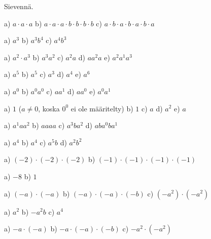 {%
Sievennä.
\begin{tehtava}
a) $a\cdot a\cdot a$ \quad b) $a\cdot a\cdot a\cdot b\cdot b\cdot b\cdot b$ \quad
c) $a\cdot b\cdot a\cdot b\cdot a\cdot b\cdot a$
\begin{vastaus}
a) $a^3$ \qquad b) $a^3b^4$ \qquad c) $a^4b^3$
\end{vastaus}
\end{tehtava}
\begin{tehtava}
a) $a^2\cdot a^3$ \qquad b) $a^3a^2$ \qquad c) $a^2 a$ \qquad d) $a a^2 a$ \qquad
e) $a^2a^1a^3$
\begin{vastaus}
a) $a^5$ \qquad b) $a^5$ \qquad c) $a^3$ \qquad d) $a^4$ \qquad e) $a^6$
\end{vastaus}
\end{tehtava}
\begin{tehtava}
a) $a^0$ \qquad b) $a^0a^0$ \qquad c) $a a^1$ \qquad d) $aa^0$ \qquad
e) $a^0a^1$
\begin{vastaus}
a) $1$ \quad ($a\neq0$, koska $0^0$ ei ole määritelty) \qquad b) $1$ \qquad c) $a$ \qquad d) $a^2$ \qquad
e) $a$
\end{vastaus}
\end{tehtava}
\begin{tehtava}
a) $a^1 a a^2$ \qquad b) $aaaa$ \qquad c) $a^3ba^2$ \qquad d) $aba^0ba^1$
\begin{vastaus}
a) $ a^4$ \qquad b) $a^4$ \qquad c) $a^5b$ \qquad d) $a^2b^2$
\end{vastaus}
\end{tehtava}
\begin{tehtava}
a) $(-2)\cdot(-2)\cdot(-2)$ \qquad b) $(-1)\cdot(-1)\cdot(-1)\cdot(-1)$
\begin{vastaus}
a) $ -8$ \qquad b) $1$
\end{vastaus}
\end{tehtava}
\begin{tehtava}
a) $(-a)\cdot(-a)$ \qquad b) $(-a)\cdot(-a)\cdot(-b)$ \qquad c) $(-a^2)\cdot(-a^2)$
\begin{vastaus}
a) $a^2$ \qquad b) $-a^2b$ \qquad c) $a^4$
\end{vastaus}
\end{tehtava}
\begin{tehtava}
a) $-a\cdot(-a)$ \qquad b) $-a\cdot(-a)\cdot(-b)$ \qquad c) $-a^2\cdot(-a^2)$

\end{tehtava}}
